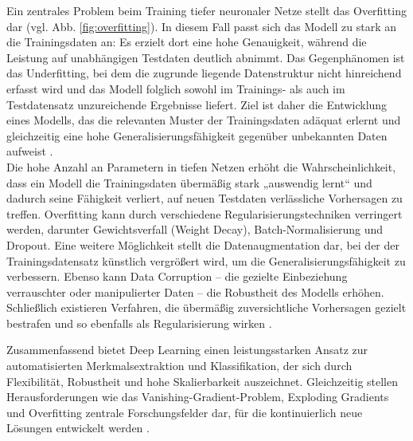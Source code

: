 Ein zentrales Problem beim Training tiefer neuronaler Netze stellt das Overfitting dar (vgl. Abb. \ref{fig:overfitting}). In diesem Fall passt sich das Modell zu stark an die Trainingsdaten an: Es erzielt dort eine hohe Genauigkeit, während die Leistung auf unabhängigen Testdaten deutlich abnimmt. Das Gegenphänomen ist das Underfitting, bei dem die zugrunde liegende Datenstruktur nicht hinreichend erfasst wird und das Modell folglich sowohl im Trainings- als auch im Testdatensatz unzureichende Ergebnisse liefert. Ziel ist daher die Entwicklung eines Modells, das die relevanten Muster der Trainingsdaten adäquat erlernt und gleichzeitig eine hohe Generalisierungsfähigkeit gegenüber unbekannten Daten aufweist \cite{overfitting_pic}.\\
Die hohe Anzahl an Parametern in tiefen Netzen erhöht die Wahrscheinlichkeit, dass ein Modell die Trainingsdaten übermäßig stark „auswendig lernt“ und dadurch seine Fähigkeit verliert, auf neuen Testdaten verlässliche Vorhersagen zu treffen. Overfitting kann durch verschiedene Regularisierungstechniken verringert werden, darunter Gewichtsverfall (Weight Decay), Batch-Normalisierung und Dropout. Eine weitere Möglichkeit stellt die Datenaugmentation dar, bei der der Trainingsdatensatz künstlich vergrößert wird, um die Generalisierungsfähigkeit zu verbessern. Ebenso kann Data Corruption – die gezielte Einbeziehung verrauschter oder manipulierter Daten – die Robustheit des Modells erhöhen. Schließlich existieren Verfahren, die übermäßig zuversichtliche Vorhersagen gezielt bestrafen und so ebenfalls als Regularisierung wirken \cite{Alzubaidi2021}.

Zusammenfassend bietet Deep Learning einen leistungsstarken Ansatz zur automatisierten Merkmalsextraktion und Klassifikation, der sich durch Flexibilität, Robustheit und hohe Skalierbarkeit auszeichnet. Gleichzeitig stellen Herausforderungen wie das Vanishing-Gradient-Problem, Exploding Gradients und Overfitting zentrale Forschungsfelder dar, für die kontinuierlich neue Lösungen entwickelt werden \cite{Alzubaidi2021}. 





